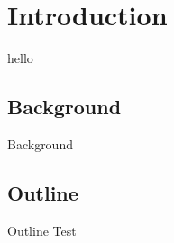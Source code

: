 \section{Introduction}
\label{sec:introduction}
hello

\subsection{Background}
Background\cite{Gusfield}

\subsection{Outline}
Outline Test
